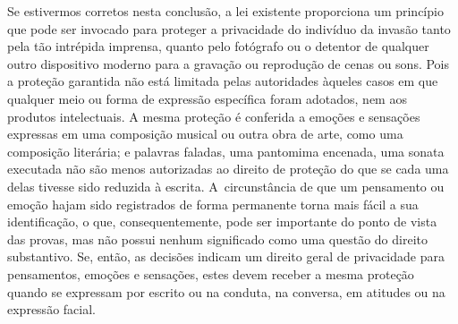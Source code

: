 Se estivermos corretos nesta conclusão, a lei existente proporciona um
princípio que pode ser invocado para proteger a privacidade do indivíduo
da invasão tanto pela tão intrépida imprensa, quanto pelo fotógrafo ou o
detentor de qualquer outro dispositivo moderno para a gravação ou
reprodução de cenas ou sons. Pois a proteção garantida não está limitada
pelas autoridades àqueles casos em que qualquer meio ou forma de
expressão específica foram adotados, nem aos produtos intelectuais. A
mesma proteção é conferida a emoções e sensações expressas em uma
composição musical ou outra obra de arte, como uma composição literária;
e palavras faladas, uma pantomima encenada, uma sonata executada não são
menos autorizadas ao direito de proteção do que se cada uma delas
tivesse sido reduzida à escrita. A~circunstância de que um pensamento ou
emoção hajam sido registrados de forma permanente torna mais fácil a sua
identificação, o que, consequentemente, pode ser importante do ponto de
vista das provas, mas não possui nenhum significado como uma questão do
direito substantivo. Se, então, as decisões indicam um direito geral de
privacidade para pensamentos, emoções e sensações, estes devem receber a
mesma proteção quando se expressam por escrito ou na conduta, na
conversa, em atitudes ou na expressão facial.

